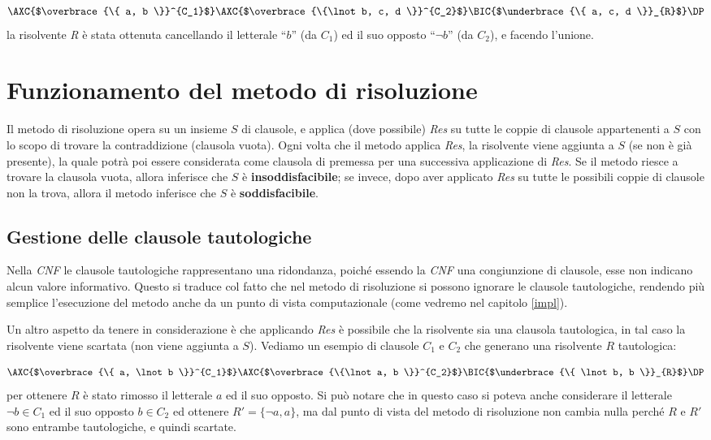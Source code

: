 \documentclass[a4paper,12pt]{report}
\begin{document}
\[
    \AXC{$\overbrace{\{ a, b \}}^{C_1}$}
    \AXC{$\overbrace{\{\lnot b, c, d \}}^{C_2}$}
    \RightLabel{Res}
    \BIC{$\underbrace{\{ a, c, d \}}_{R}$}
    \DP
\]
la risolvente \emph{R} è stata ottenuta cancellando il letterale ``$b$'' (da $C_1$) ed il suo opposto ``$\lnot b$'' (da $C_2$), e facendo l'unione.

\section{Funzionamento del metodo di risoluzione}
Il metodo di risoluzione opera su un insieme $S$ di clausole, e applica (dove possibile) \emph{Res} su tutte le coppie di clausole appartenenti a $S$ con lo scopo di trovare la contraddizione (clausola vuota). Ogni volta che il metodo applica \emph{Res}, la risolvente viene aggiunta a $S$ (se non è già presente), la quale potrà poi essere considerata come clausola di premessa per una successiva applicazione di \emph{Res}. Se il metodo riesce a trovare la clausola vuota, allora inferisce che $S$ è \textbf{insoddisfacibile}; se invece, dopo aver applicato \emph{Res} su tutte le possibili coppie di clausole non la trova, allora il metodo inferisce che $S$ è \textbf{soddisfacibile}.

\subsection{Gestione delle clausole tautologiche}
Nella \emph{CNF} le clausole tautologiche rappresentano una ridondanza, poiché essendo la \emph{CNF} una congiunzione di clausole, esse non indicano alcun valore informativo. Questo si traduce col fatto che nel metodo di risoluzione si possono ignorare le clausole tautologiche, rendendo più semplice l'esecuzione del metodo anche da un punto di vista computazionale (come vedremo nel capitolo \ref{impl}).

Un altro aspetto da tenere in considerazione è che applicando \emph{Res} è possibile che la risolvente sia una clausola tautologica, in tal caso la risolvente viene scartata (non viene aggiunta a $S$). Vediamo un esempio di clausole $C_1$ e $C_2$ che generano una risolvente $R$ tautologica:

\[
    \AXC{$\overbrace{\{ a, \lnot b \}}^{C_1}$}
    \AXC{$\overbrace{\{\lnot a, b \}}^{C_2}$}
    \RightLabel{Res}
    \BIC{$\underbrace{\{ \lnot b, b \}}_{R}$}
    \DP
\]
per ottenere $R$ è stato rimosso il letterale $a$ ed il suo opposto. Si può notare che in questo caso si poteva anche considerare il letterale $\lnot b \in C_1$ ed il suo opposto $b \in C_2$ ed ottenere $R' = \{ \lnot a, a \}$, ma dal punto di vista del metodo di risoluzione non cambia nulla perché $R$ e $R'$ sono entrambe tautologiche, e quindi scartate.
\end{document}
